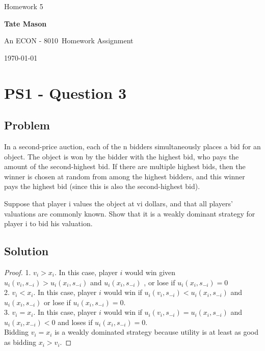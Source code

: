 \documentclass[10pt, a4paper]{article}
\newcommand\course{ECON - 8010}                            %
\newcommand\hwnumber{ 5}                                 %
\newcommand\Information{Tate Mason}                        %
\begin{document}
  \begin{titlepage}
    \begin{center}
      \vspace*{3cm}
            
        \vspace{1cm}
        \huge
        Homework \hwnumber
            
        \vspace{1.5cm}
        \Large
            
        \textbf{\Information}                      %
            
        \vfill
        
        An \course \ Homework Assignment
            
        \vspace{1cm}
        \Large

        
        \today
            
    \end{center}
  \end{titlepage}

  \newpage
\section*{PS1 - Question 3}
  \subsection*{Problem}
    In a second-price auction, each of the n bidders simultaneously places a bid for an
    object. The object is won by the bidder with the highest bid, who pays the amount of
    the second-highest bid. If there are multiple highest bids, then the winner is chosen at random from among the highest bidders, and this winner pays the highest bid (since this is also the second-highest bid).

    Suppose that player i values the object at vi dollars, and that all players’ valuations are commonly known. Show that it is a weakly dominant strategy for player i to bid his valuation.
  \subsection*{Solution}
    \begin{proof}
      1. $v_i>x_i$. In this case, player $i$ would win given $u_i(v_i, s_{-i}) > u_i(x_i, s_{-i})$ and $u_i(x_i, s_{-i})$ , or lose if $u_i(x_i, s_{-i}) = 0$ \\
      2. $v_i < x_i$. In this case, player $i$ would win if $u_i(v_i, s_{-i})<u_i(x_i, s_{-i})$ and $u_i(x_i, s_{-i})$ or lose if $u_i(x_i, s_{-i}) = 0$. \\
      3. $v_i = x_i$. In this case, player $i$ would win if $u_i(v_i, s_{-i}) = u_i(x_i, s_{-i})$ and $u_i(x_i, x_{-i}) < 0$ and loses if $u_i(x_i, s_{-i}) = 0$. \\
      Bidding $v_i=x_i$ is a weakly dominated strategy because utility is at least as good as bidding $x_i>v_i$. 
    \end{proof}
\end{document}
